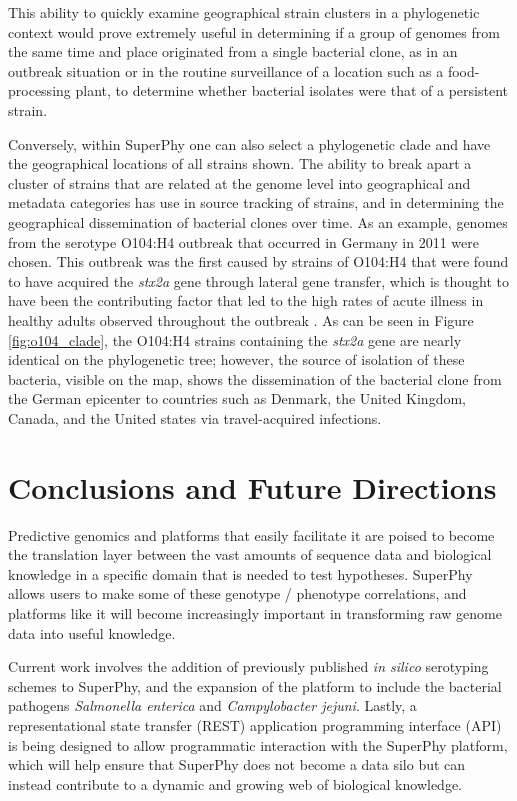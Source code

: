 \documentclass[doublespacing, linenumbers]{bmcart}
\begin{document}
This ability to quickly examine geographical strain clusters in a phylogenetic context would prove extremely useful in determining if a group of genomes from the same time and place originated from a single bacterial clone, as in an outbreak situation or in the routine surveillance of a location such as a food-processing plant, to determine whether bacterial isolates were that of a persistent strain. 

Conversely, within SuperPhy one can also select a phylogenetic clade and have the geographical locations of all strains shown. The ability to break apart a cluster of strains that are related at the genome level into geographical and metadata categories has use in source tracking of strains, and in determining the geographical dissemination of bacterial clones over time. As an example, genomes from the serotype O104:H4 outbreak that occurred in Germany in 2011 were chosen. This outbreak was the first caused by strains of O104:H4 that were found to have acquired the \textit{stx2a} gene through lateral gene transfer, which is thought to have been the contributing factor that led to the high rates of acute illness in healthy adults observed throughout the outbreak \cite{mellmann_prospective_2011}. As can be seen in Figure \ref{fig:o104_clade}, the O104:H4 strains containing the \textit{stx2a} gene are nearly identical on the phylogenetic tree; however, the source of isolation of these bacteria, visible on the map, shows the dissemination of the bacterial clone from the German epicenter to countries such as Denmark, the United Kingdom, Canada, and the United states via travel-acquired infections.




\section{Conclusions and Future Directions}
Predictive genomics and platforms that easily facilitate it are poised to become the translation layer between the vast amounts of sequence data and biological knowledge in a specific domain that is needed to test hypotheses. SuperPhy allows users to make some of these genotype / phenotype correlations, and platforms like it will become increasingly important in transforming raw genome data into useful knowledge. 

Current work involves the addition of previously published \textit{in silico} serotyping schemes to SuperPhy, and the expansion of the platform to include the bacterial pathogens \textit{Salmonella enterica} and \textit{Campylobacter jejuni}. Lastly, a representational state transfer (REST) application programming interface (API) is being designed to allow programmatic interaction with the SuperPhy platform, which will help ensure that SuperPhy does not become a data silo but can instead contribute to a dynamic and growing web of biological knowledge.
 
\end{document}
